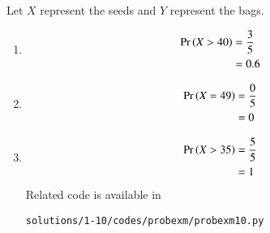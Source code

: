 Let $X$ represent the seeds and $Y$ represent the bags.
\begin{enumerate}
\item 
\begin{align}
\Pr\left(X > 40\right) &= \frac{3}{5}
\\
&= 0.6
\end{align}
\item
\begin{align}
\Pr\left(X=49\right) &= \frac{0}{5}
\\
&= 0
\end{align}
\item 
\begin{align}
\Pr\left(X>35\right) &= \frac{5}{5}
\\
&= 1
\end{align}
Related code is available in
\begin{lstlisting}
solutions/1-10/codes/probexm/probexm10.py
\end{lstlisting}
\end{enumerate}
